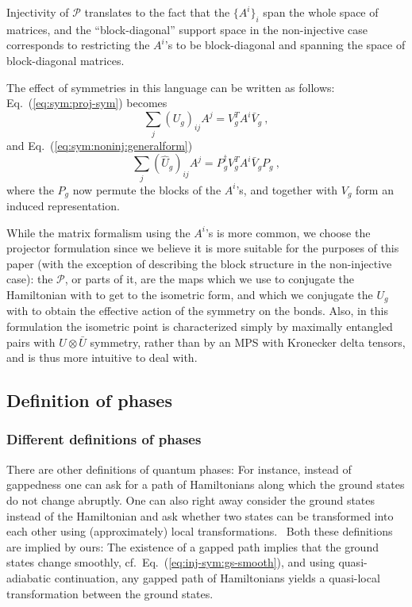 \documentclass[twocolumn,superscriptaddress,prb,linenumbers]{revtex4-1}
\newcommand{\mc}[1]{\mathcal{#1}}
\begin{document}
Injectivity of $\mc P$ translates to the fact that the $\{A^i\}_i$ span the
whole space of matrices, and the ``block-diagonal'' support space in the
non-injective case corresponds to restricting  the $A^i$'s to be
block-diagonal and spanning the space of block-diagonal matrices.

The effect of symmetries in this language can be written as follows:
Eq.~(\ref{eq:sym:proj-sym}) becomes
\[
    \sum_j(U_g)_{ij} A^j = V_g^T A^i \bar V_g\ ,
\]
and Eq.~(\ref{eq:sym:noninj:generalform})
\[
    \sum_j(\hat U_g)_{ij} A^j = P_g^\dagger V_g^T A^i \bar V_gP_g\ ,
\]
where the $P_g$ now permute the blocks of the $A^i$'s, and together with
$V_g$ form an induced representation.


While the matrix formalism using the $A^i$'s is more common,
we choose the projector formulation since we
believe it is more suitable for the purposes of this paper (with the
exception of describing the block structure in the non-injective case):
the $\mc P$, or parts of it, are the maps which we use to conjugate the
Hamiltonian with to get to the isometric form, and which we conjugate the
$U_g$ with to obtain the effective action of the symmetry on the bonds.
Also, in this formulation the isometric point is characterized simply by
maximally entangled pairs with $U\otimes \bar U$ symmetry, rather than by
an MPS with Kronecker delta tensors, and is thus more intuitive to deal
with.






\subsection{Definition of phases
    \label{sec:discussion:def-of-phases}}

\subsubsection{Different definitions of phases}

There are other definitions of quantum phases: For instance, instead of
gappedness one can ask for a path of Hamiltonians along which the ground
states do not change abruptly. One can also right away consider the ground
states instead of the Hamiltonian and ask whether two states can be
transformed into each other using (approximately) local
transformations.~\cite{chen:1d-phases-rg}
Both these definitions are implied by ours: The existence of a gapped path
implies that the ground states change smoothly,
cf.~Eq.~(\ref{eq:inj-sym:gs-smooth}), and using quasi-adiabatic
continuation,\cite{hastings:quasi-adiabatic} any gapped path of
Hamiltonians yields a quasi-local transformation between the ground
states.\cite{bachmann:quasi-adiabatic}
\end{document}
